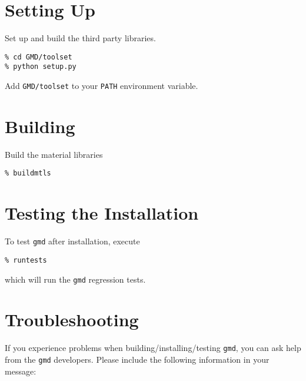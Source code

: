 \documentclass[11pt]{report}
\newcommand{\gmd}{\texttt{gmd}}
\begin{document}
\section{Setting Up}
Set up and build the third party libraries.
\begin{verbatim}
% cd GMD/toolset
% python setup.py
\end{verbatim}

Add \texttt{GMD/toolset} to your \texttt{PATH} environment variable.

\section{Building}
Build the material libraries
\begin{verbatim}
% buildmtls
\end{verbatim}

\section{Testing the Installation}
To test \gmd{} after installation, execute

\begin{verbatim}
% runtests
\end{verbatim}

which will run the \gmd{} regression tests.

\section{Troubleshooting}
If you experience problems when building/installing/testing \gmd{}, you can
ask help from the \gmd{} developers. Please include the following information
in your message:
\end{document}
